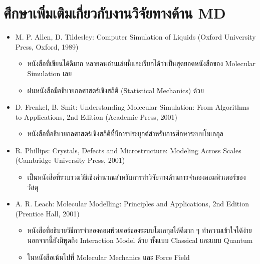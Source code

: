 \section{ศึกษาเพิ่มเติมเกี่ยวกับงานวิจัยทางด้าน MD}

\begin{itemize}[topsep=0pt,noitemsep]
  \setlength\itemsep{0.5em}
  \item M. P. Allen, D. Tildesley: Computer Simulation of Liquids (Oxford University Press, Oxford, 1989)
        \begin{itemize}[noitemsep]
          \setlength\itemsep{0.5em}
          \item หนังสือที่เขียนได้ดีมาก หลายคนอ่านเล่มนี้และเรียกได้ว่าเป็นสุดยอดหนังสือของ Molecular Simulation เลย

          \item ฝนหนังสือมีอธิบายกลศาสตร์เชิงสถิติ (Statistical Mechanics) ด้วย
        \end{itemize}

  \item D. Frenkel, B. Smit: Understanding Molecular Simulation: From Algorithms to Applications, 2nd Edition
        (Academic Press, 2001)
        \begin{itemize}[noitemsep]
          \setlength\itemsep{0.5em}
          \item หนังสือที่อธิบายกลศาสตร์เชิงสถิติที่มีการประยุกต์สำหรับการศึกษาระบบโมเลกุล
        \end{itemize}

  \item R. Phillips: Crystals, Defects and Microstructure: Modeling Across Scales (Cambridge University Press,
        2001)
        \begin{itemize}[noitemsep]
          \setlength\itemsep{0.5em}
          \item เป็นหนังสือที่รวบรวมวิธีเชิงคำนวณสำหรับการทำวิจัยทางด้านการจำลองคอมพิวเตอร์ของวัสดุ
        \end{itemize}

  \item A. R. Leach: Molecular Modelling: Principles and Applications, 2nd Edition (Prentice Hall, 2001)
        \begin{itemize}[noitemsep]
          \setlength\itemsep{0.5em}
          \item หนังสือที่อธิบายวิธีการจำลองคอมพิวเตอร์ของระบบโมเลกุลได้ดีมาก ๆ ทำความเข้าใจได้ง่าย นอกจากนี้ยังมีพูดถึง Interaction Model
                ด้วย ทั้งแบบ Classical และแบบ Quantum

          \item ในหนังสือเน้นไปที่ Molecular Mechanics และ Force Field
        \end{itemize}

\end{itemize}

